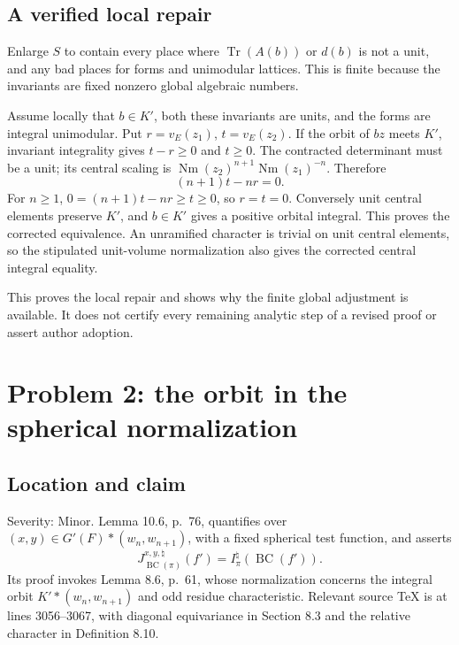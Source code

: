 \documentclass[10pt]{article}
\begin{document}
\subsection*{A verified local repair}
Enlarge \(S\) to contain every place where \(\operatorname{Tr}(A(b))\) or \(d(b)\) is not a unit, and any bad places for forms and unimodular lattices. This is finite because the invariants are fixed nonzero global algebraic numbers.\par
Assume locally that \(b\in K'\), both these invariants are units, and the forms are integral unimodular. Put \(r=v_E(z_1)\), \(t=v_E(z_2)\). If the orbit of \(bz\) meets \(K'\), invariant integrality gives \(t-r\ge0\) and \(t\ge0\). The contracted determinant must be a unit; its central scaling is \(\operatorname{Nm}(z_2)^{n+1}\operatorname{Nm}(z_1)^{-n}\). Therefore \[(n+1)t-nr=0.\] For \(n\ge1\), \(0=(n+1)t-nr\ge t\ge0\), so \(r=t=0\). Conversely unit central elements preserve \(K'\), and \(b\in K'\) gives a positive orbital integral. This proves the corrected equivalence. An unramified character is trivial on unit central elements, so the stipulated unit-volume normalization also gives the corrected central integral equality.\par
This proves the local repair and shows why the finite global adjustment is available. It does not certify every remaining analytic step of a revised proof or assert author adoption.\par
\section*{Problem 2: the orbit in the spherical normalization}
\subsection*{Location and claim}
Severity: Minor. Lemma 10.6, p. 76, quantifies over \((x,y)\in G'(F)*(w_n,w_{n+1})\), with a fixed spherical test function, and asserts \[J^{x,y,\natural}_{\operatorname{BC}(\pi)}(f')=I^\natural_\pi(\operatorname{BC}(f')). \tag{P2}\] Its proof invokes Lemma 8.6, p. 61, whose normalization concerns the integral orbit \(K'*(w_n,w_{n+1})\) and odd residue characteristic. Relevant source TeX is at lines 3056–3067, with diagonal equivariance in Section 8.3 and the relative character in Definition 8.10.\par
\end{document}
